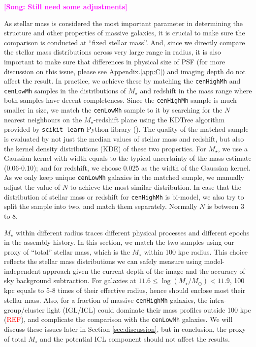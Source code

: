 \documentclass{emulateapj}
\def\rbcg{\texttt{cenHighMh}}
\def\nbcg{\texttt{cenLowMh}}
\def\mstar{{$M_{\star}$}}
\newcommand{\addref}{{\textcolor{red}{REF}}}
\newcommand{\song}[1]{\textcolor{magenta}{\textbf{[Song: #1]}}}
\begin{document}
\begin{CJK*}{UTF8}{gbsn}
    \song{Still need some adjustments}
    
    As stellar mass is considered the most important parameter in determining the 
    structure and other properties of massive galaxies, it is crucial to make sure 
    the comparison is conducted at ``fixed stellar mass''. 
    And, since we directly compare the stellar mass distributions across very large 
    range in radius, it is also important to make sure that differences in physical 
    size of PSF (for more discussion on this issue, please see Appendix.\ref{app:C}) 
    and imaging depth do not affect the result.    
    In practice, we achieve these by matching the \rbcg{} and \nbcg{} samples in 
    the distributions of \mstar{} and redshift in the mass range where both 
    samples have decent completeness.  
    Since the \rbcg{} sample is much smaller in size, we match the \nbcg{} sample to it 
    by searching for the $N$ nearest neighbours on the $M_{\star}$-redshift 
    plane using the KDTree algorithm provided by \texttt{scikit-learn} Python 
    library (\citealt{scikit-learn}). 
    The quality of the matched sample is evaluated by not just the median values 
    of stellar mass and redshift, but also the kernel density distributions (KDE) 
    of these two properties.
    For \mstar{}, we use a Gaussian kernel with width equals to the typical 
    uncertainty of the mass estimate (0.06-0.10);
    and for redshift, we choose 0.025 as the width of the Gaussian kernel. 
    As we only keep unique \nbcg{} galaxies in the matched sample, we manually adjust 
    the value of $N$ to achieve the most similar distribution. 
    In case that the distribution of stellar mass or redshift for \rbcg{} is 
    bi-model, we also try to split the sample into two, and match them separately.
    Normally $N$ is between 3 to 8.
    
    \mstar{} within different radius traces different physical processes and 
    different epochs in the assembly history.  
    In this section, we match the two samples using our proxy of ``total'' stellar 
    mass, which is the \mstar{} within 100 kpc radius.  
    This choice reflects the stellar mass distributions we can safely measure using 
    model-independent approach given the current depth of the image and the accuracy 
    of sky background subtraction.
    For galaxies at $11.6 \leq \log(M_{\star}/M_{\odot}) < 11.9$, 100 kpc equals to 
    5-8 times of their effective radius, hence should enclose most their stellar mass.
    Also, for a fraction of massive \rbcg{} galaxies, the intra-group/cluster light
    (IGL/ICL) could dominate their mass profiles outside 100 kpc (\addref), and 
    complicate the comparison with the \nbcg{} galaxies.  
    We will discuss these issues later in Section \ref{sec:discussion}, but in 
    conclusion, the proxy of total \mstar{} and the potential ICL component should 
    not affect the results.     
    

\end{CJK*}
\end{document}
